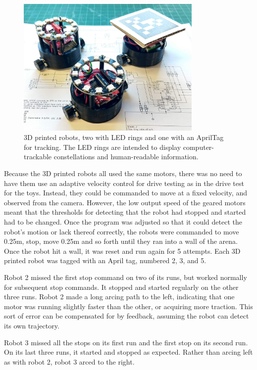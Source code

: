 \begin{figure}
	\centering
	\includegraphics[width=0.8\textwidth]{../3dp_robo.png}
	\caption{3D printed robots, two with LED rings and one with an AprilTag for tracking. The LED rings are intended to display computer-trackable constellations and human-readable information.}
	\label{fig:3dp_robos}
\end{figure}


Because the 3D printed robots all used the same motors, there was no need to have them use an adaptive velocity control for drive testing as in the drive test for the toys. 
Instead, they could be commanded to move at a fixed velocity, and observed from the camera. 
However, the low output speed of the geared motors meant that the thresholds for detecting that the robot had stopped and started had to be changed. 
Once the program was adjusted so that it could detect the robot's motion or lack thereof correctly, the robots were commanded to move 0.25m, stop, move 0.25m and so forth until they ran into a wall of the arena. 
Once the robot hit a wall, it was reset and run again for 5 attempts. 
Each 3D printed robot was tagged with an April tag, numbered 2, 3, and 5. 

Robot 2 missed the first stop command on two of its runs, but worked normally for subsequent stop commands. 
It stopped and started regularly on the other three runs.
Robot 2 made a long arcing path to the left, indicating that one motor was running slightly faster than the other, or acquiring more traction.
This sort of error can be compensated for by feedback, assuming the robot can detect its own trajectory. 

Robot 3 missed all the stops on its first run and the first stop on its second run.
On its last three runs, it started and stopped as expected. 
Rather than arcing left as with robot 2, robot 3 arced to the right. 

